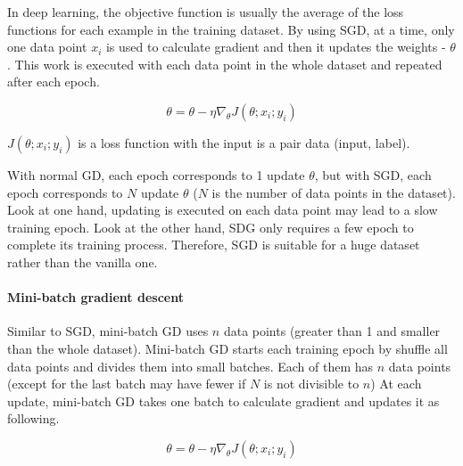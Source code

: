 	In deep learning, the objective function is usually the average of the loss functions for each example in the training dataset. By using SGD, at a time, only one data point $x_i$ is used to calculate gradient and then it updates the weights -  $\theta$. This work is executed with each data point in the whole dataset and repeated after each epoch. 
	
	\[\theta = \theta - \eta \nabla_{\theta} J(\theta; x_i; y_i)\]
	
	\noindent
	$ J(\theta; x_i; y_i)$ is a loss function with the input is a pair data (input, label).
	
	With normal GD, each epoch corresponds to 1 update $\theta$, but with SGD, each epoch corresponds to $N$ update $\theta$ ($N$ is the number of data points in the dataset). Look at one hand, updating is executed on each data point may lead to a slow training epoch. Look at the other hand, SDG only requires a few epoch to complete its training process. Therefore, SGD is suitable for a huge dataset rather than the vanilla one.
	
	
	\paragraph{Mini-batch gradient descent}
	\noindent
	
	Similar to SGD, mini-batch GD uses $n$ data points (greater than 1 and smaller than the whole dataset). Mini-batch GD starts each training epoch by shuffle all data points and divides them into small batches. Each of them has $n$ data points (except for the last batch may have fewer if $N$ is not divisible to $n$) At each update, mini-batch GD takes one batch to calculate gradient and updates it as following.
	
	\[ \theta = \theta - \eta \nabla_{\theta} J(\theta; x_i; y_i) \]
	
	
	
	